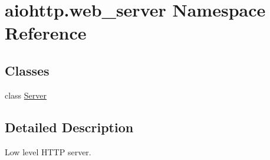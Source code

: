 \hypertarget{namespaceaiohttp_1_1web__server}{}\section{aiohttp.\+web\+\_\+server Namespace Reference}
\label{namespaceaiohttp_1_1web__server}
\subsection*{Classes}
\begin{DoxyCompactItemize}
\item 
class \hyperlink{classaiohttp_1_1web__server_1_1_server}{Server}
\end{DoxyCompactItemize}


\subsection{Detailed Description}
\begin{DoxyVerb}Low level HTTP server.\end{DoxyVerb}
 